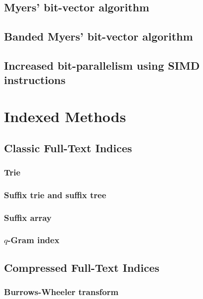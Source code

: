 \section{Myers' bit-vector algorithm}
\section{Banded Myers' bit-vector algorithm}
\section{Increased bit-parallelism using SIMD instructions}

\chapter{Indexed Methods}
\section{Classic Full-Text Indices}
\subsection{Trie}
\subsection{Suffix trie and suffix tree}
\subsection{Suffix array}
\subsection{$q$-Gram index}
\section{Compressed Full-Text Indices}
\subsection{Burrows-Wheeler transform}
